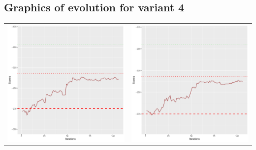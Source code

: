 \documentclass[]{scrartcl}
\begin{document}
\clearpage

\subsection{Graphics of evolution for variant 4}

\begin{table}[h!]
\begin{tabular}{cc}
\includegraphics[scale = 0.4]{./figs/asia/v4/10/boundsEvolution-107.pdf} & 
\includegraphics[scale = 0.4]{./figs/asia/v4/20/boundsEvolution-107.pdf} \\

\end{tabular}
\end{table}
\end{document}
